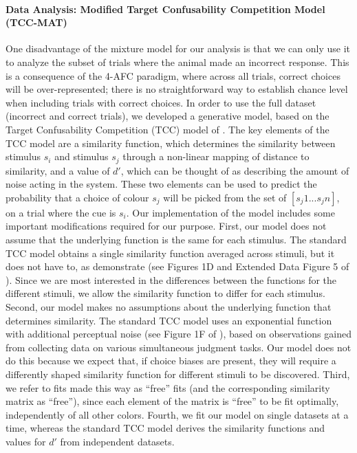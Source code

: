 \paragraph{Data Analysis: Modified Target Confusability Competition Model (TCC-MAT)}\label{para:TCC}
One disadvantage of the mixture model for our analysis is that we can only use it to analyze the subset of trials where the animal made an incorrect response.
This is a consequence of the 4-AFC paradigm, where across all trials, correct choices will be over-represented; there is no straightforward way to establish chance level when including trials with correct choices. 
In order to use the full dataset (incorrect and correct trials), we developed a generative model, based on the Target Confusability Competition (TCC) model of \cite{schurgin_psychophysical_2020}. 
The key elements of the TCC model are a similarity function, which determines the similarity between stimulus $s_i$ and stimulus $s_j$ through a non-linear mapping of distance to similarity, and a value of $d'$, which can be thought of as describing the amount of noise acting in the system. 
These two elements can be used to predict the probability that a choice of colour $s_j$ will be picked from the set of $[s_j1...s_jn ]$, on a trial where the cue is $s_i$. 
Our implementation of the model includes some important modifications required for our purpose.
First, our model does not assume that the underlying function is the same for each stimulus. 
The standard TCC model obtains a single similarity function averaged across stimuli, but it does not have to, as \cite{schurgin_psychophysical_2020} demonstrate (see Figures 1D and Extended Data Figure 5 of \cite{schurgin_psychophysical_2020}). 
Since we are most interested in the differences between the functions for the different stimuli, we allow the similarity function to differ for each stimulus. 
Second, our model makes no assumptions about the underlying function that determines similarity. 
The standard TCC model uses an exponential function with additional perceptual noise (see Figure 1F of \cite{schurgin_psychophysical_2020}), based on observations gained from collecting data on various simultaneous judgment tasks. 
Our model does not do this because we expect that, if choice biases are present, they will require a differently shaped similarity function for different stimuli to be discovered. 
Third, we refer to fits made this way as “free” fits (and the corresponding similarity matrix as “free”), since each element of the matrix is “free” to be fit optimally, independently of all other colors. 
Fourth, we fit our model on single datasets at a time, whereas the standard TCC model derives the similarity functions and values for $d'$ from independent datasets.

